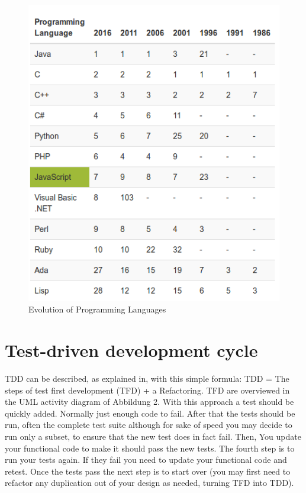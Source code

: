 \documentclass[11pt]{article}
\begin{document}
\begin{figure}[!ht]
\includegraphics[scale=0.45]{Motivation.png}
  \caption{Evolution of Programming Languages}
\end{figure}

\section{Test-driven development cycle}
TDD can be described, as explained in, with this simple formula: TDD = The steps of test first development (TFD) + a Refactoring. TFD are overviewed in the UML activity diagram of Abbildung 2. With this approach a test should be quickly added. Normally just enough code to fail. After that the tests should be run, often the complete test suite although for sake of speed you may decide to run only a subset, to ensure that the new test does in fact fail. Then, You update your functional code to make it should pass the new tests. The fourth step is to run your tests again. If they fail you need to update your functional code and retest. Once the tests pass the next step is to start over (you may first need to refactor any duplication out of your design as needed, turning TFD into TDD).
\end{document}

